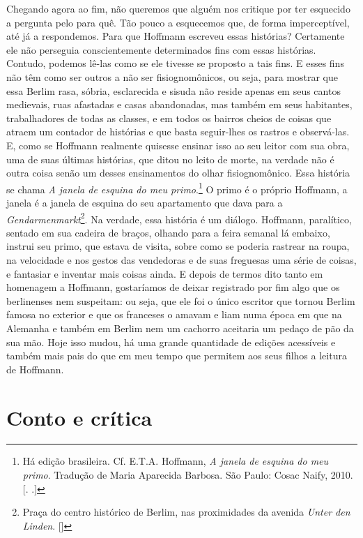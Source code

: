 Chegando agora ao fim, não queremos que alguém nos critique por ter
esquecido a pergunta pelo para quê. Tão pouco a esquecemos que, de forma
imperceptível, até já a respondemos. Para que Hoffmann escreveu essas
histórias? Certamente ele não perseguia conscientemente determinados
fins com essas histórias. Contudo, podemos lê-las como se ele tivesse se
proposto a tais fins. E esses fins não têm como ser outros a não ser
fisiognomônicos, ou seja, para mostrar que essa Berlim rasa, sóbria,
esclarecida e sisuda não reside apenas em seus cantos medievais, ruas
afastadas e casas abandonadas, mas também em seus habitantes,
trabalhadores de todas as classes, e em todos os bairros cheios de coisas
que atraem um contador de histórias e que basta seguir-lhes os rastros e
observá-las. E, como se Hoffmann realmente quisesse ensinar isso ao seu
leitor com sua obra, uma de suas últimas histórias, que ditou no leito
de morte, na verdade não é outra coisa senão um desses ensinamentos do
olhar fisiognomônico. Essa história se chama \emph{A janela de esquina
do meu primo}.\footnote{Há edição brasileira. Cf. E.T.A. Hoffmann,
  \emph{A janela de esquina do meu primo}. Tradução de Maria Aparecida
  Barbosa. São Paulo: Cosac Naify, 2010. [. .]} O
primo é o próprio Hoffmann, a janela é a janela de esquina do seu
apartamento que dava para a \emph{Gendarmenmarkt}\footnote{Praça do centro histórico de Berlim, nas proximidades da avenida \emph{Unter den Linden}. []}. Na
verdade, essa história é um diálogo. Hoffmann, paralítico, sentado em
sua cadeira de braços, olhando para a feira semanal lá embaixo, instrui
seu primo, que estava de visita, sobre como se poderia rastrear na
roupa, na velocidade e nos gestos das vendedoras e de suas freguesas uma
série de coisas, e fantasiar e inventar mais coisas ainda. E depois de
termos dito tanto em homenagem a Hoffmann, gostaríamos de deixar
registrado por fim algo que os berlinenses nem suspeitam: ou seja, que
ele foi o único escritor que tornou Berlim famosa no exterior e que os
franceses o amavam e liam numa época em que na Alemanha e também em
Berlim nem um cachorro aceitaria um pedaço de pão da sua mão. Hoje isso
mudou, há uma grande quantidade de edições acessíveis e também mais pais
do que em meu tempo que permitem aos seus filhos a leitura de Hoffmann.

\part{Conto e crítica}

